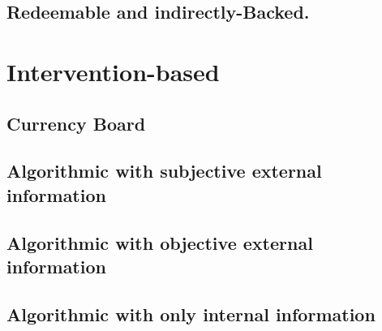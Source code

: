 \subsection{Redeemable and indirectly-Backed.}



\section{Intervention-based} %

 
\subsection{Currency Board}

\subsection{Algorithmic with subjective external information}

\subsection{Algorithmic with objective external information}

\subsection{Algorithmic with only internal information}

